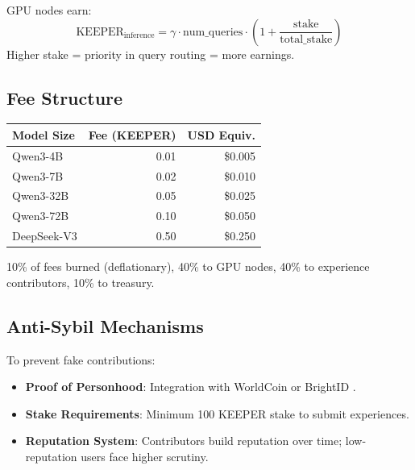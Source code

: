 GPU nodes earn:
\[
\text{KEEPER}_{\text{inference}} = \gamma \cdot \text{num\_queries} \cdot \left(1 + \frac{\text{stake}}{\text{total\_stake}}\right)
\]
Higher stake = priority in query routing = more earnings.

\subsection{Fee Structure}

\begin{center}
\begin{tabular}{lrr}
\toprule
\textbf{Model Size} & \textbf{Fee (KEEPER)} & \textbf{USD Equiv.} \\
\midrule
Qwen3-4B & 0.01 & \$0.005 \\
Qwen3-7B & 0.02 & \$0.010 \\
Qwen3-32B & 0.05 & \$0.025 \\
Qwen3-72B & 0.10 & \$0.050 \\
DeepSeek-V3 & 0.50 & \$0.250 \\
\bottomrule
\end{tabular}
\end{center}

10\% of fees burned (deflationary), 40\% to GPU nodes, 40\% to experience contributors, 10\% to treasury.

\subsection{Anti-Sybil Mechanisms}

To prevent fake contributions:
\begin{itemize}
\item \textbf{Proof of Personhood}: Integration with WorldCoin \cite{worldcoin2023whitepaper} or BrightID \cite{brightid2021whitepaper}.
\item \textbf{Stake Requirements}: Minimum 100 KEEPER stake to submit experiences.
\item \textbf{Reputation System}: Contributors build reputation over time; low-reputation users face higher scrutiny.
\end{itemize}

